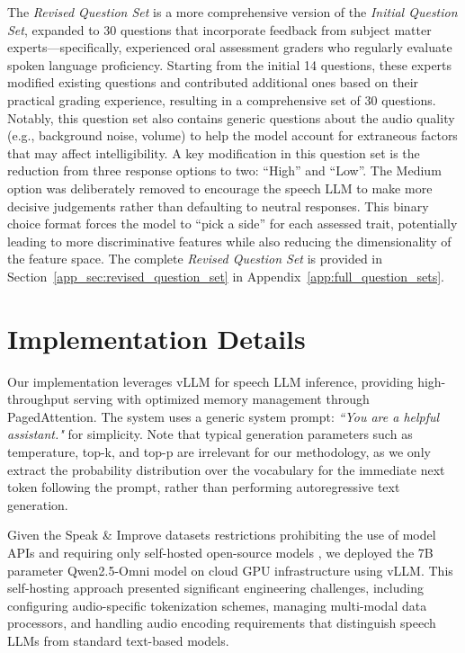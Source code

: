 \documentclass{report}
\begin{document}
The \emph{Revised Question Set} is a more comprehensive version of the \emph{Initial Question Set}, expanded to 30 questions that incorporate feedback from subject matter experts—specifically, experienced oral assessment graders who regularly evaluate spoken language proficiency. Starting from the initial 14 questions, these experts modified existing questions and contributed additional ones based on their practical grading experience, resulting in a comprehensive set of 30 questions. Notably, this question set also contains generic questions about the audio quality (e.g., background noise, volume) to help the model account for extraneous factors that may affect intelligibility. A key modification in this question set is the reduction from three response options to two: ``High'' and ``Low''. The Medium option was deliberately removed to encourage the speech LLM to make more decisive judgements rather than defaulting to neutral responses. This binary choice format forces the model to ``pick a side'' for each assessed trait, potentially leading to more discriminative features while also reducing the dimensionality of the feature space. The complete \emph{Revised Question Set} is provided in Section~\ref{app_sec:revised_question_set} in Appendix~\ref{app:full_question_sets}.

\section{Implementation Details}
\label{sec:implementation_details}
Our implementation leverages vLLM \citep{kwon2023efficientmemorymanagementlarge} for speech LLM inference, providing high-throughput serving with optimized memory management through PagedAttention. The system uses a generic system prompt: \emph{``You are a helpful assistant."} for simplicity. Note that typical generation parameters such as temperature, top-k, and top-p are irrelevant for our methodology, as we only extract the probability distribution over the vocabulary for the immediate next token following the prompt, rather than performing autoregressive text generation.

Given the Speak \& Improve datasets restrictions prohibiting the use of model APIs and requiring only self-hosted open-source models \citep{knill2024sandi}, we deployed the 7B parameter Qwen2.5-Omni model on cloud GPU infrastructure using vLLM. This self-hosting approach presented significant engineering challenges, including configuring audio-specific tokenization schemes, managing multi-modal data processors, and handling audio encoding requirements that distinguish speech LLMs from standard text-based models.
\end{document}
